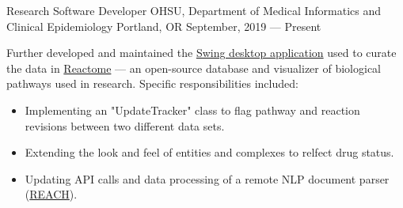\showoff
{Research Software Developer}
{OHSU, Department of Medical Informatics and Clinical Epidemiology}
{Portland, OR}
{September, 2019 --- Present}

Further developed and maintained the {\textcolor{my-blue}{\href{https://github.com/reactome/CuratorTool}{Swing desktop application}}} used to curate the data in {\textcolor{my-blue}{\href{https://reactome.org/}{Reactome}}} --- an open-source database and visualizer of biological pathways used in research. Specific responsibilities included:

\begin{itemize}[label=$\triangleright$]
\item Implementing an "UpdateTracker" class to flag pathway and reaction revisions between two different data sets.
\item Extending the look and feel of entities and complexes to relfect drug status.
\item Updating API calls and data processing of a remote NLP document parser (\textcolor{my-blue}{\href{https://github.com/clulab/reach}{REACH}}).
\end{itemize}

